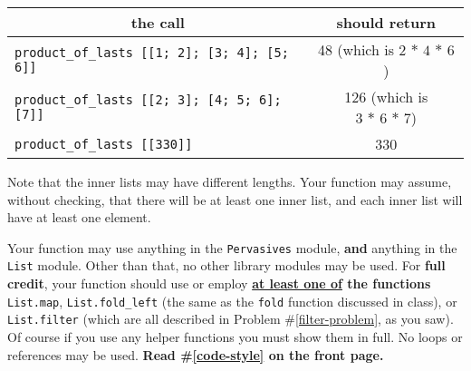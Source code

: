 \documentclass[11pt]{article}
\begin{document}
\begin{enumerate}
\begin{center}
            \begin{tabular}[t]{|l|c|}

              \multicolumn{1}{c}{the call}
                & \multicolumn{1}{c}{should return}
                \\ \hline

              \texttt{product\_of\_lasts [[1; 2]; [3; 4]; [5; 6]]}
                & 48 (which is $2 \, * \, 4 \, * \, 6$)
                \\ \hline

              \texttt{product\_of\_lasts [[2; 3]; [4; 5; 6]; [7]]}
                & 126 (which is $3 \, * \, 6 \, * \, 7$)
                \\ \hline

              \texttt{product\_of\_lasts [[330]]}
                & 330
                \\ \hline

            \end{tabular}

          \end{center}

          \vspace{-1.5mm}

          Note that the inner lists may have different lengths.  Your
          function may assume, without checking, that there will be at least
          one inner list, and each inner list will have at least one
          element.

          Your function may use anything in the \texttt{Pervasives} module,
          \textbf{and} anything in the \texttt{List} module.  Other than
          that, no other library modules may be used.  For \textbf{full
          credit}, your function should use or employ
          \textbf{\underline{at least one of} the functions}
          \texttt{List.map}, \texttt{List.fold\_left} (the same as the
          \texttt{fold} function discussed in class), or
          \texttt{List.filter} (which are all described in Problem
          \#\ref{filter-problem}, as you saw).  Of course if you use any
          helper functions you must show them in full.  No loops or
          references may be used.  \textbf{Read \#\ref{code-style} on the
          front page.}

          \smallskip

          \enlargethispage{6mm}


          \pagebreak


\end{enumerate}
\end{document}
